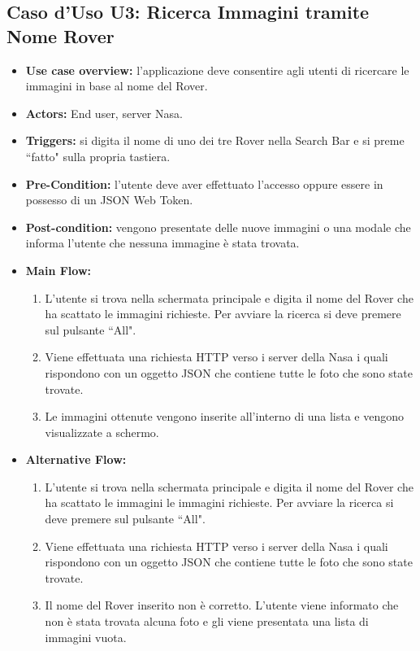 \subsection*{Caso d'Uso U3: Ricerca Immagini tramite Nome Rover}
\begin{itemize}
    \item  \textbf{Use case overview:} l'applicazione deve consentire agli utenti di ricercare le immagini in base al nome del Rover.
    \item \textbf{Actors:} End user, server Nasa.
    \item \textbf{Triggers:} si digita il nome di uno dei tre Rover nella Search Bar e si preme ``fatto" sulla propria tastiera.
    \item \textbf{Pre-Condition:} l'utente deve aver effettuato l'accesso oppure essere in possesso di un JSON Web Token.
    \item \textbf{Post-condition:} vengono presentate delle nuove immagini o una modale che informa l'utente che nessuna immagine \`e stata trovata.
    \item \textbf{Main Flow:} \begin{enumerate}
              \item L'utente si trova nella schermata principale e digita il nome del Rover che ha scattato le immagini richieste. Per avviare la ricerca si deve premere sul pulsante ``All".
              \item Viene effettuata una richiesta HTTP verso i server della Nasa i quali rispondono con un oggetto JSON che contiene tutte le foto che sono state trovate.
              \item Le immagini ottenute vengono inserite all'interno di una lista e vengono visualizzate a schermo.

          \end{enumerate}
    \item \textbf{Alternative Flow:}\begin{enumerate}
              \item L'utente si trova nella schermata principale e digita il nome del Rover che ha scattato le immagini le immagini richieste. Per avviare la ricerca si deve premere sul pulsante ``All".
              \item Viene effettuata una richiesta HTTP verso i server della Nasa i quali rispondono con un oggetto JSON che contiene tutte le foto che sono state trovate.
              \item Il nome del Rover inserito non \`e corretto. L'utente viene informato che non \`e stata trovata alcuna foto e gli viene presentata una lista di immagini vuota.

          \end{enumerate}
\end{itemize}
